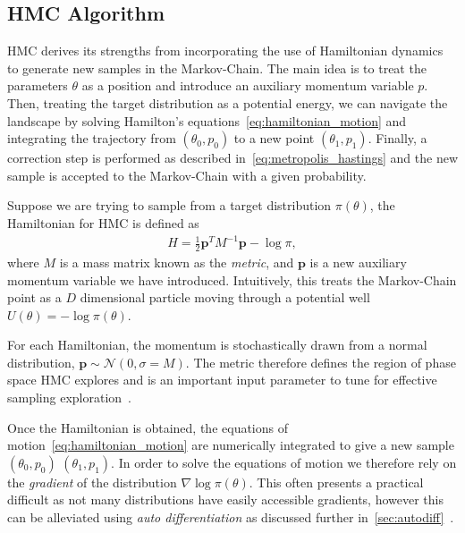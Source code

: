 \documentclass[11pt]{article}
\begin{document}
\subsection{HMC Algorithm}\label{subsec:hmc_algorithm}
    HMC derives its strengths from incorporating the use of Hamiltonian dynamics to generate new samples in the Markov-Chain.
    The main idea is to treat the parameters $\theta$ as a position and introduce an auxiliary momentum variable $p$.
    Then, treating the target distribution as a potential energy, we can navigate the landscape by solving Hamilton's
    equations~\eqref{eq:hamiltonian_motion} and integrating the trajectory from $(\theta_0, p_0)$ to a new point
    $(\theta_1, p_1)$.
    Finally, a correction step is performed as described in~\eqref{eq:metropolis_hastings} and the new sample is accepted
    to the Markov-Chain with a given probability.

    Suppose we are trying to sample from a target distribution $\pi(\theta)$, the Hamiltonian for HMC is defined as
    \begin{equation}\label{eq:hmc_hamiltonian}
    \begin{aligned}
        H = \frac{1}{2} \mathbf{p}^T M^{-1} \mathbf{p} - \log \pi,
    \end{aligned}
    \end{equation}
    where $M$ is a mass matrix known as the \emph{metric}, and $\mathbf{p}$ is a new auxiliary momentum variable we have introduced.
    Intuitively, this treats the Markov-Chain point as a $D$ dimensional particle moving through a
    potential well $U(\theta) = -\log \pi(\theta)$.

    For each Hamiltonian, the momentum is stochastically drawn from a normal distribution,
    $\mathbf{p} \sim \mathcal{N}(0, \sigma = M)$.
    The metric therefore defines the region of phase space HMC explores and is an important input parameter to
    tune for effective sampling exploration~\cite{betancourt2016energymetric}.

    Once the Hamiltonian is obtained, the equations of motion~\eqref{eq:hamiltonian_motion} are numerically integrated
    to give a new sample $(\theta_0, p_0)$ \rightarrow $(\theta_1, p_1)$.
    In order to solve the equations of motion we therefore rely on the \emph{gradient} of the
    distribution $\nabla \log \pi(\theta)$.
    This often presents a practical difficult as not many distributions have easily accessible gradients, however this
    can be alleviated using \emph{auto differentiation} as discussed further in~\cref{sec:autodiff}~\cite{carpenter2015stan}.
\end{document}
